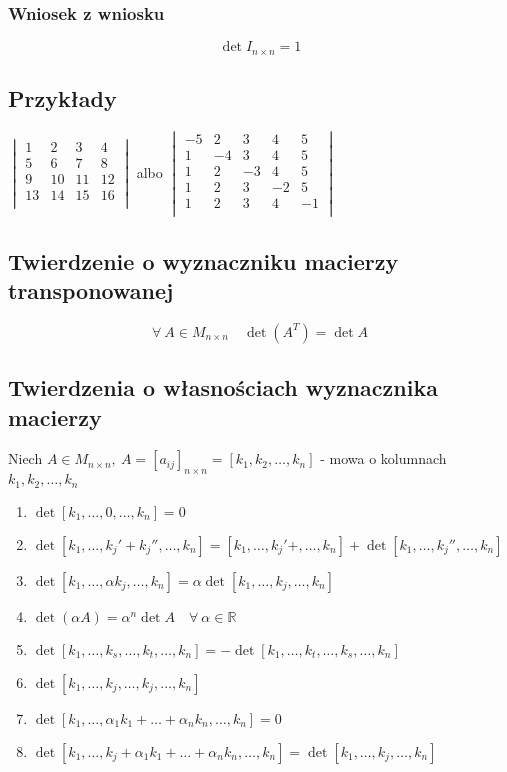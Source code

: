 \documentclass[11pt]{article}
\begin{document}
\subsubsection{Wniosek z wniosku}
$$ \det I_{n\times n} = 1$$
\subsection{Przykłady}
$\begin{vmatrix}
	1 & 2 & 3 & 4\\
	5 & 6 & 7 & 8\\
	9 & 10 & 11 & 12\\
	13 & 14 & 15 & 16\\
\end{vmatrix}$
albo
$\begin{vmatrix}
	-5 & 2 & 3 & 4 & 5\\
	1 & -4 & 3 & 4 & 5\\
	1 & 2 & -3 & 4 & 5\\
	1 & 2 & 3 & -2 & 5\\
	1 & 2 & 3 & 4 & -1\\
\end{vmatrix}$
\subsection{Twierdzenie o wyznaczniku macierzy transponowanej}
$$ \forall \ A \in M_{n \times n} \quad \det (A^{T}) = \det A$$
\subsection{Twierdzenia o własnościach wyznacznika macierzy}
Niech $A \in M_{n \times n},\ A=[a_{ij}]_{n\times n} = [ k_1,k_2,\ldots,k_n]$ - mowa o kolumnach $k_1,k_2,\ldots ,k_n$
\begin{enumerate}
\item{$\det [ k_1,\ldots,0,\ldots,k_n] = 0$}
\item{$\det [ k_1,\ldots,k_j' + k_j'',\ldots,k_n] =
 [ k_1,\ldots,k_j' +,\ldots,k_n] + \det[ k_1,\ldots, k_j'',\ldots,k_n] $}
 \item{$\det [k_1,\ldots,\alpha k_j , \ldots , k_n] = \alpha \det[k_1,\ldots,k_j,\ldots, k_n]$}
 \item{$\det(\alpha A) = \alpha^n \det A \quad \forall \ \alpha \in \mathbb{R}$}
 \item{$\det [k_1,\ldots,k_s,\ldots,k_t,\ldots,k_n] = - \det [k_1,\ldots,k_t,\ldots,k_s,\ldots,k_n]$}
 \item{$\det [k_1,\ldots,k_j,\dots,k_j,\ldots,k_n]$}
 \item{$\det [k_1,\ldots,\alpha_1 k_1 + \ldots + \alpha_n k_n, \ldots, k_n] = 0$}
 \item{$\det [k_1,\ldots,k_j + \alpha_1 k_1 + \ldots + \alpha_n k_n, \ldots, k_n] = \det [ k_1,\ldots,k_j,\ldots,k_n]$}
 \end{enumerate}
\end{document}
